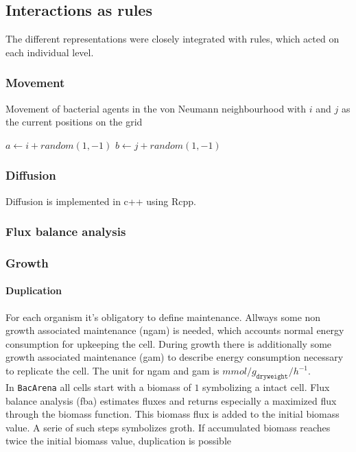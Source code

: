 \subsection{Interactions as rules}
The different representations were closely integrated with rules, which acted on each individual level.

\subsubsection{Movement}
\begin{algorithm}
\caption{Movement of bacterial agents in the von Neumann neighbourhood with $i$ and $j$ as the current positions on the grid}
\SetAlgoLined
$a \leftarrow i+random(1,-1)$\;
$b \leftarrow j+random(1,-1)$\;
\end{algorithm}

\subsubsection{Diffusion}
Diffusion is implemented in c++ using Rcpp.
\begin{algorithm}
  \caption{}
  \SetAlgoLined
\end{algorithm}


\subsubsection{Flux balance analysis}

\subsubsection{Growth}
\paragraph{Duplication}
For each organism it's obligatory to define maintenance.
Allways some non growth associated maintenance (ngam) is needed, which accounts normal energy consumption for upkeeping the cell.
During growth there is additionally some growth associated maintenance (gam) to describe energy consumption necessary to replicate the cell. The unit for ngam and gam is $mmol/g_{\texttt{dryweight}}/h^{-1}$\cite{Thiele2010}.\\
In \texttt{BacArena} all cells start with a biomass of $1$ symbolizing a intact cell.
Flux balance analysis (fba) estimates fluxes and returns especially a maximized flux through the biomass function.
This biomass flux is added to the initial biomass value. A serie of such steps symbolizes groth.
If accumulated biomass reaches twice the initial biomass value, duplication is possible
